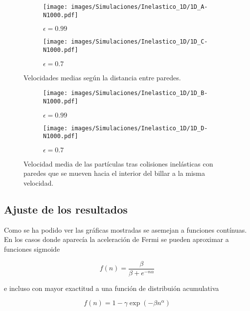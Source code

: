 \documentclass[11pt, spanish]{book}
\begin{document}
\begin{figure}[H]
    \begin{subfigure}[b]{0.5\textwidth}
        \centering
        \texttt{[image: images/Simulaciones/Inelastico\_1D/1D\_A-N1000.pdf]}
        \caption{$\epsilon = 0.99$}
    \end{subfigure}
    \hfill
    \begin{subfigure}[b]{0.5\textwidth}
        \centering
        \texttt{[image: images/Simulaciones/Inelastico\_1D/1D\_C-N1000.pdf]}
        \caption{$\epsilon = 0.7$}
    \end{subfigure}
    \caption{Velocidades medias según la distancia entre paredes.}
    \label{fig:1D_inelastic_A}
\end{figure}

\begin{figure}[H]
    \begin{subfigure}[b]{0.5\textwidth}
        \centering
        \texttt{[image: images/Simulaciones/Inelastico\_1D/1D\_B-N1000.pdf]}
        \caption{$\epsilon = 0.99$}
    \end{subfigure}
    \hfill
    \begin{subfigure}[b]{0.5\textwidth}
        \centering
        \texttt{[image: images/Simulaciones/Inelastico\_1D/1D\_D-N1000.pdf]}
        \caption{$\epsilon = 0.7$}
    \end{subfigure}
    \caption{Velocidad media de las partículas tras colisiones inelásticas con paredes que se mueven hacia el interior del billar a la misma velocidad.}
    \label{fig:1D_inelastic_B}
\end{figure}

\subsection{Ajuste de los resultados}

Como se ha podido ver las gráficas mostradas se asemejan a funciones contínuas. En los casos donde aparecía la aceleración de Fermi se pueden aproximar a funciones sigmoide

\begin{equation}
    f(n) = \dfrac{\beta}{\beta + e^{-n\alpha}}
\end{equation}

e incluso con mayor exactitud a una función de distribuión acumulativa

\begin{equation}
    f(n) = 1 - \gamma\exp(-\beta n^\alpha)
\end{equation}
\end{document}
